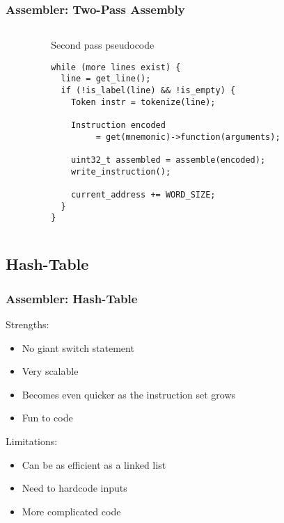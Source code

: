 \documentclass{beamer}
\begin{document}
\begin{frame}[fragile]
\frametitle{Assembler: Two-Pass Assembly}

\begin{columns}

\begin{column}{0.07\textwidth}
\end{column}

\begin{column}{0.80\textwidth}
\begin{block}{Second pass pseudocode}
\begin{verbatim}
while (more lines exist) {
  line = get_line(); 
  if (!is_label(line) && !is_empty) {
    Token instr = tokenize(line);
    
    Instruction encoded 
         = get(mnemonic)->function(arguments);
   
    uint32_t assembled = assemble(encoded);
    write_instruction();
   
    current_address += WORD_SIZE;
  }
}\end{verbatim}
\end{block}
\end{column}

\begin{column}{0.07\textwidth}
\end{column}

\end{columns}

\end{frame}
\subsection{Hash-Table}
\begin{frame}[fragile]
\frametitle{Assembler: Hash-Table}

\begin{large}
Strengths:
\end{large}

\begin{itemize}
\item No giant switch statement
\item Very scalable
\item Becomes even quicker as the instruction set grows
\item Fun to code
\end{itemize}

\begin{large}
Limitations:
\end{large}

\begin{itemize}
\item Can be as efficient as a linked list
\item Need to hardcode inputs
\item More complicated code
\end{itemize}

\end{frame}
\end{document}
